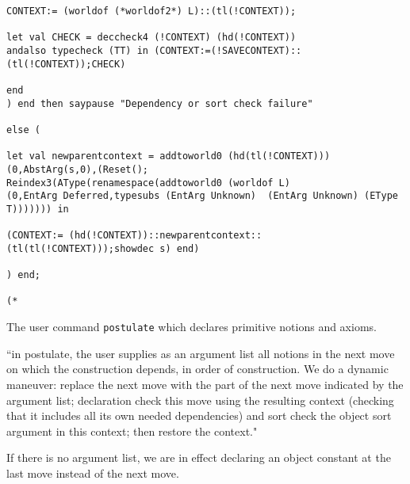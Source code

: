 \documentclass{article}
\begin{document}
\begin{verbatim}
CONTEXT:= (worldof (*worldof2*) L)::(tl(!CONTEXT));

let val CHECK = deccheck4 (!CONTEXT) (hd(!CONTEXT)) 
andalso typecheck (TT) in (CONTEXT:=(!SAVECONTEXT)::(tl(!CONTEXT));CHECK) 

end
) end then saypause "Dependency or sort check failure"

else (

let val newparentcontext = addtoworld0 (hd(tl(!CONTEXT)))
(0,AbstArg(s,0),(Reset();
Reindex3(AType(renamespace(addtoworld0 (worldof L) 
(0,EntArg Deferred,typesubs (EntArg Unknown)  (EntArg Unknown) (EType T))))))) in

(CONTEXT:= (hd(!CONTEXT))::newparentcontext::(tl(tl(!CONTEXT)));showdec s) end)

) end;

(*

\end{verbatim}

The user command {\tt postulate} which declares primitive notions and axioms.

``in postulate, the user supplies as an argument list
all notions in the next move on which the construction
depends, in order of construction.
We do a dynamic maneuver:  replace the next move with the 
part of the next move indicated by the argument list;
declaration check this move using the resulting context 
(checking that it includes all its own needed dependencies)
and sort check the object sort argument in this context; then restore the context."

If there is no argument list, we are in effect declaring an object constant at the last move
instead of the next move.
\end{document}
